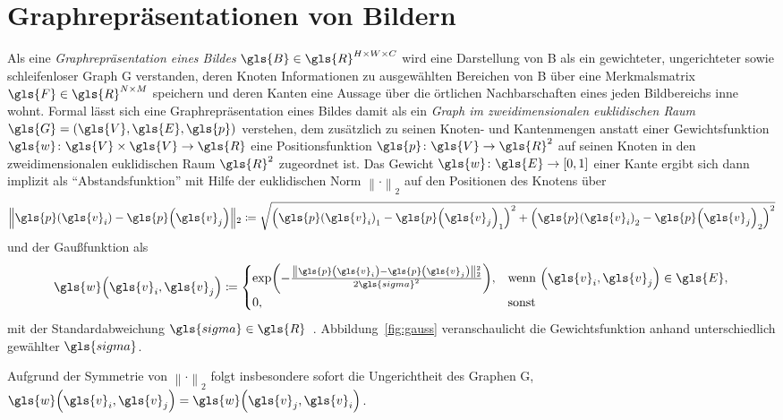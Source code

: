 \chapter{Graphrepräsentationen von Bildern}
\label{graphrepraesentationen_von_bildern}

Als eine \emph{Graphrepräsentation eines Bildes} $\gls{B} \in \gls{R}^{H \times W \times C}$ wird eine Darstellung von \gls{B} als ein gewichteter, ungerichteter sowie schleifenloser Graph \gls{G} verstanden, deren Knoten Informationen zu ausgewählten Bereichen von \gls{B} über eine Merkmalsmatrix $\gls{F} \in \gls{R}^{N \times M}$ speichern und deren Kanten eine Aussage über die örtlichen Nachbarschaften eines jeden Bildbereichs inne wohnt.
Formal lässt sich eine Graphrepräsentation eines Bildes damit als ein \emph{Graph im zweidimensionalen euklidischen Raum} $\gls{G} = \left(\gls{V}, \gls{E}, \gls{p}\right)$ verstehen, dem zusätzlich zu seinen Knoten- und Kantenmengen anstatt einer Gewichtsfunktion $\gls{w} \colon \gls{V} \times \gls{V} \to \gls{R}$ eine Positionsfunktion $\gls{p} \colon \gls{V} \to \gls{R}^2$ auf seinen Knoten in den zweidimensionalen euklidischen Raum $\gls{R}^2$ zugeordnet ist.
Das Gewicht $\gls{w} \colon \gls{E} \to \left[0, 1\right]$ einer Kante ergibt sich dann implizit als \enquote{Abstandsfunktion} mit Hilfe der euklidischen Norm $\left\|\cdot\right\|_2$ auf den Positionen des Knotens über
\begin{equation*}
  \left\|\gls{p}\left(\gls{v}_i\right) - \gls{p}\left(\gls{v}_j\right) \right\|_2 \coloneqq \sqrt{{\left({\gls{p}\left(\gls{v}_i\right)}_1 - {\gls{p}\left(\gls{v}_j\right)}_1\right)}^2 + {\left({\gls{p}\left(\gls{v}_i\right)}_2 - {\gls{p}\left(\gls{v}_j\right)}_2\right)}^2}
\end{equation*}
und der Gaußfunktion als
\begin{equation}
  \gls{w}\left(\gls{v}_i, \gls{v}_j\right) \coloneqq \begin{cases}
    \exp\left(-\frac{\left\|\gls{p}\left(\gls{v}_i\right) - \gls{p}\left(\gls{v}_j\right)\right\|_2^2}{2\gls{sigma}^2}\right), & \text{wenn }\left(\gls{v}_i, \gls{v}_j\right) \in \gls{E},\\
    0, & \text{sonst}
  \end{cases}
  \label{gauss}
\end{equation}
mit der Standardabweichung $\gls{sigma} \in \gls{R}$~\cite{Shuman}.
Abbildung~\ref{fig:gauss} veranschaulicht die Gewichtsfunktion anhand unterschiedlich gewählter $\gls{sigma}$.

Aufgrund der Symmetrie von ${\left\|\cdot\right\|}_2$ folgt insbesondere sofort die Ungerichtheit des Graphen \gls{G}, \dhe{} $\gls{w}\left(\gls{v}_i, \gls{v}_j\right) = \gls{w}\left(\gls{v}_j, \gls{v}_i\right)$.
